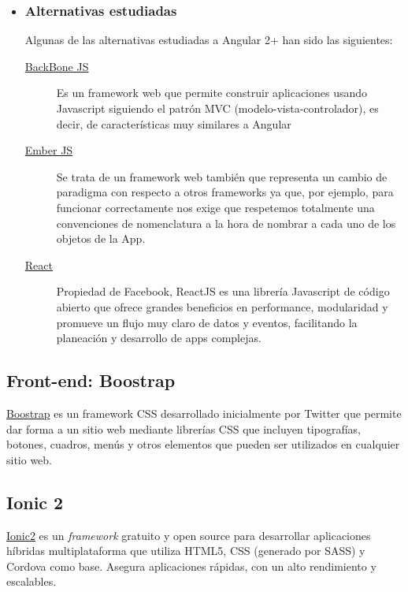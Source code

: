 \begin{itemize}
	\item	\subsubsection{Alternativas estudiadas}
	
	Algunas de las alternativas estudiadas a Angular 2+ han sido las siguientes:
	\begin{description}
\item[ \href{https://www.backbonejs.org/}{BackBone JS} ] Es un framework web que permite construir aplicaciones usando Javascript siguiendo el patrón MVC (modelo-vista-controlador), es decir, de características muy similares a Angular
\item[ \href{https://www.emberjs.com/}{Ember JS} ] Se trata de un framework web también que representa un cambio de paradigma con respecto a otros frameworks ya que, por ejemplo, para funcionar correctamente nos exige que respetemos totalmente una convenciones de nomenclatura a la hora de nombrar a cada uno de los objetos de la App.
\item[ \href{https://facebook.github.io/react/}{React} ] Propiedad de Facebook, ReactJS es una librería Javascript de código abierto que ofrece grandes beneficios en performance, modularidad y promueve un flujo muy claro de datos y eventos, facilitando la planeación y desarrollo de apps complejas. 
\end{description}
\end{itemize}


\subsection{Front-end: Boostrap}\label{tecnologias_boostrap}
\href{https://www.getbootstrap.com/}{Boostrap} es un framework CSS desarrollado inicialmente  por Twitter que permite dar forma a un sitio web mediante librerías CSS que incluyen tipografías, botones, cuadros, menús y otros elementos que pueden ser utilizados en cualquier sitio web.


\subsection{ Ionic 2}\label{tecnologias_ionic2}
\href{https://ionicframework.com/}{Ionic2} es un \emph{framework} gratuito y open source para desarrollar aplicaciones híbridas multiplataforma que utiliza HTML5, CSS (generado por SASS) y Cordova como base. Asegura aplicaciones rápidas, con un alto rendimiento y escalables.


